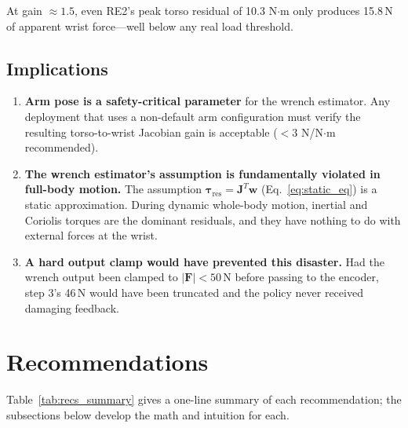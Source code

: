 \documentclass[11pt,a4paper]{article}
\newcommand{\bJ}{\bm{J}}
\newcommand{\btau}{\bm{\tau}}
\newcommand{\bw}{\bm{w}}
\begin{document}
At gain $\approx 1.5$, even RE2's peak torso residual of 10.3 N$\cdot$m
only produces 15.8\,N of apparent wrist force---well below any real
load threshold.

\subsection{Implications}

\begin{enumerate}
\item \textbf{Arm pose is a safety-critical parameter} for the wrench
      estimator.  Any deployment that uses a non-default arm configuration
      must verify the resulting torso-to-wrist Jacobian gain is acceptable
      ($<3$ N/N$\cdot$m recommended).

\item \textbf{The wrench estimator's assumption is fundamentally violated
      in full-body motion.}  The assumption $\btau_\text{res} = \bJ^T\bw$
      (Eq.~\ref{eq:static_eq}) is a static approximation.  During dynamic
      whole-body motion, inertial and Coriolis torques are the dominant
      residuals, and they have nothing to do with external forces at the
      wrist.

\item \textbf{A hard output clamp would have prevented this disaster.}
      Had the wrench output been clamped to $|\bm{F}| < 50$\,N before
      passing to the encoder, step 3's 46\,N would have been truncated and
      the policy never received damaging feedback.
\end{enumerate}

\section{Recommendations}

Table~\ref{tab:recs_summary} gives a one-line summary of each recommendation;
the subsections below develop the math and intuition for each.
\end{document}
